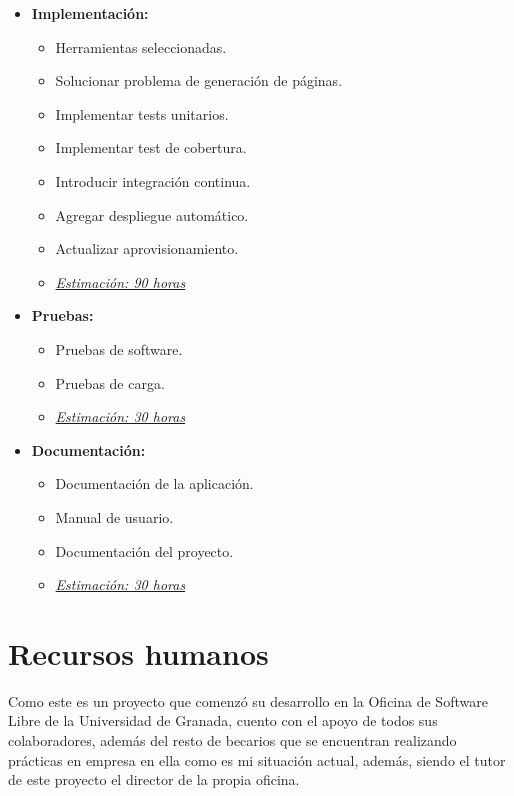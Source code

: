 \begin{itemize}
 \item \textbf{Implementación:}
 \begin{itemize}
  \item Herramientas seleccionadas.
  \item Solucionar problema de generación de páginas.
  \item Implementar tests unitarios.
  \item Implementar test de cobertura.
  \item Introducir integración continua.
  \item Agregar despliegue automático.
  \item Actualizar aprovisionamiento.
  \item \underline{\textit{Estimación: 90 horas}}
 \end{itemize}
\end{itemize}

\newpage
\begin{itemize}
 \item \textbf{Pruebas:}
 \begin{itemize}
  \item Pruebas de software.
  \item Pruebas de carga.
  \item \underline{\textit{Estimación: 30 horas}}
 \end{itemize}
\end{itemize}

\begin{itemize}
 \item \textbf{Documentación:}
 \begin{itemize}
  \item Documentación de la aplicación.
  \item Manual de usuario.
  \item Documentación del proyecto.
  \item \underline{\textit{Estimación: 30 horas}}
 \end{itemize}
\end{itemize}

\section{Recursos humanos}

Como este es un proyecto que comenzó su desarrollo en la Oficina de Software Libre de la Universidad de Granada, cuento con el apoyo de todos sus colaboradores, además del resto de becarios que se encuentran realizando prácticas en empresa en ella como es mi situación actual, además, siendo el tutor de este proyecto el director de la propia oficina.

